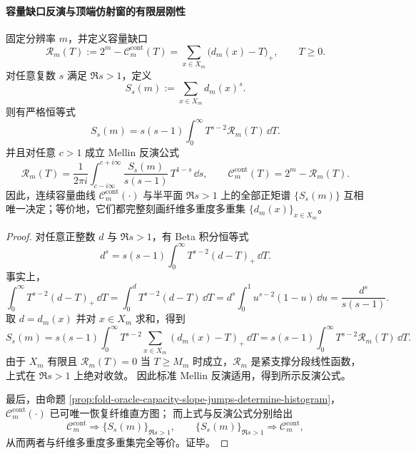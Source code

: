 \paragraph{容量缺口反演与顶端仿射窗的有限层刚性}

\begin{theorem}\label{thm:fold-capacity-gap-mellin-stieltjes-duality}
固定分辨率 \(m\)，并定义容量缺口
\[
\mathcal R_m(T):=2^m-\mathcal C_m^{\mathrm{cont}}(T)
=\sum_{x\in X_m}\bigl(d_m(x)-T\bigr)_+,\qquad T\ge 0.
\]
对任意复数 \(s\) 满足 \(\Re s>1\)，定义
\[
S_s(m):=\sum_{x\in X_m}d_m(x)^s.
\]
则有严格恒等式
\[
\boxed{\;
S_s(m)=s(s-1)\int_{0}^{\infty}T^{s-2}\mathcal R_m(T)\,\dd T.\;}
\]
并且对任意 \(c>1\) 成立 Mellin 反演公式
\[
\boxed{\;
\mathcal R_m(T)=\frac{1}{2\pi i}\int_{c-i\infty}^{c+i\infty}
\frac{S_s(m)}{s(s-1)}\,T^{1-s}\,\dd s,
\qquad
\mathcal C_m^{\mathrm{cont}}(T)=2^m-\mathcal R_m(T).\;}
\]
因此，连续容量曲线 \(\mathcal C_m^{\mathrm{cont}}(\cdot)\) 与半平面 \(\Re s>1\) 上的全部正矩谱 \(\{S_s(m)\}\) 互相唯一决定；等价地，它们都完整刻画纤维多重度多重集 \(\{d_m(x)\}_{x\in X_m}\)。
\end{theorem}
\begin{proof}
对任意正整数 \(d\) 与 \(\Re s>1\)，有 Beta 积分恒等式
\[
d^s=s(s-1)\int_{0}^{\infty}T^{s-2}(d-T)_+\,\dd T.
\]
事实上，
\[
\int_{0}^{\infty}T^{s-2}(d-T)_+\,\dd T
=\int_{0}^{d}T^{s-2}(d-T)\,\dd T
=d^s\int_{0}^{1}u^{s-2}(1-u)\,\dd u
=\frac{d^s}{s(s-1)}.
\]
取 \(d=d_m(x)\) 并对 \(x\in X_m\) 求和，得到
\[
S_s(m)
=s(s-1)\int_{0}^{\infty}T^{s-2}\sum_{x\in X_m}(d_m(x)-T)_+\,\dd T
=s(s-1)\int_{0}^{\infty}T^{s-2}\mathcal R_m(T)\,\dd T.
\]
由于 \(X_m\) 有限且 \(\mathcal R_m(T)=0\) 当 \(T\ge M_m\) 时成立，\(\mathcal R_m\) 是紧支撑分段线性函数，上式在 \(\Re s>1\) 上绝对收敛。
因此标准 Mellin 反演适用，得到所示反演公式。

最后，由命题 \ref{prop:fold-oracle-capacity-slope-jumps-determine-histogram}，\(\mathcal C_m^{\mathrm{cont}}(\cdot)\) 已可唯一恢复纤维直方图；
而上式与反演公式分别给出
\[
\mathcal C_m^{\mathrm{cont}}\Longrightarrow \{S_s(m)\}_{\Re s>1},
\qquad
\{S_s(m)\}_{\Re s>1}\Longrightarrow \mathcal C_m^{\mathrm{cont}},
\]
从而两者与纤维多重度多重集完全等价。证毕。
\end{proof}

